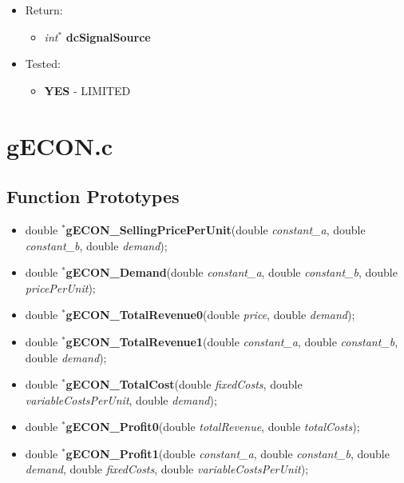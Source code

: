 \documentclass{article}
\begin{document}
{{{{\begin{itemize}
\begin{itemize}[noitemsep]
	\end{itemize}
\item Return:
	\begin{itemize}
	\item \textit{int$^{\ast}$} \textbf{dcSignalSource}
	\end{itemize}
\item Tested:
	\begin{itemize}
	\item \textbf{YES} - LIMITED
	\end{itemize}
\end{itemize}
\cleardoublepage
\section{gECON.c}

\subsection{Function Prototypes}
{\renewcommand{\labelitemi}{$\triangleright$}
\begin{itemize}[noitemsep]
\footnotesize
\item double $^{\ast}$\textbf{gECON\_SellingPricePerUnit}(double \textit{constant\_a}, double \textit{constant\_b}, double \textit{demand});
\item double $^{\ast}$\textbf{gECON\_Demand}(double \textit{constant\_a}, double \textit{constant\_b}, double \textit{pricePerUnit});
\item double $^{\ast}$\textbf{gECON\_TotalRevenue0}(double \textit{price}, double \textit{demand});
\item double $^{\ast}$\textbf{gECON\_TotalRevenue1}(double \textit{constant\_a}, double \textit{constant\_b}, double \textit{demand});
\item double $^{\ast}$\textbf{gECON\_TotalCost}(double \textit{fixedCosts}, double \textit{variableCostsPerUnit}, double \textit{demand});
\item double $^{\ast}$\textbf{gECON\_Profit0}(double \textit{totalRevenue}, double \textit{totalCosts});
\item double $^{\ast}$\textbf{gECON\_Profit1}(double \textit{constant\_a}, double \textit{constant\_b}, double \textit{demand}, double \textit{fixedCosts}, double \textit{variableCostsPerUnit});
\normalsize
\end{itemize}
\cleardoublepage
{\renewcommand{\labelitemi}{$\bullet$}

}}}}}}
\end{document}
